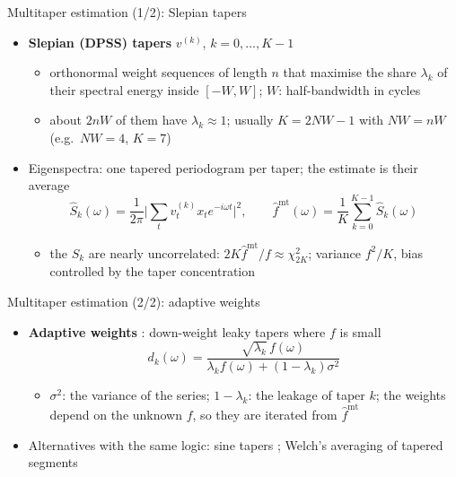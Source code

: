 \begin{frame}{Multitaper estimation (1/2): Slepian tapers}
\itemsize{\small}
\begin{itemize}
    \item \textbf{Slepian (DPSS) tapers} $v^{(k)}$, $k = 0, \dots, K - 1$ 
    \begin{itemize}
        \item orthonormal weight sequences of length $n$ that maximise the share $\lambda_k$ of their spectral energy inside $[-W, W]$; $W$: half-bandwidth in cycles
        \item about $2nW$ of them have $\lambda_k \approx 1$; usually $K = 2NW - 1$ with $NW = nW$ (e.g.\ $NW = 4$, $K = 7$)
    \end{itemize}
    \item Eigenspectra: one tapered periodogram per taper; the estimate is their average
    \[ \hat S_k(\omega) = \frac{1}{2\pi}\Big|\sum_tv_t^{(k)}x_te^{-i\omega t}\Big|^2, \qquad \hat f^{\mathrm{mt}}(\omega) = \frac1K\sum_{k=0}^{K-1}\hat S_k(\omega) \]
    \begin{itemize}
        \item the $\hat S_k$ are nearly uncorrelated: $2K\hat f^{\mathrm{mt}}/f \approx \chi^2_{2K}$; variance $f^2/K$, bias controlled by the taper concentration
    \end{itemize}
\end{itemize}
\end{frame}

\begin{frame}{Multitaper estimation (2/2): adaptive weights}
\itemsize{\small}
\begin{itemize}
    \item \textbf{Adaptive weights} : down-weight leaky tapers where $f$ is small
    \[ d_k(\omega) = \frac{\sqrt{\lambda_k}\,f(\omega)}{\lambda_kf(\omega) + (1 - \lambda_k)\sigma^2} \]
    \begin{itemize}
        \item $\sigma^2$: the variance of the series; $1 - \lambda_k$: the leakage of taper $k$; the weights depend on the unknown $f$, so they are iterated from $\hat f^{\mathrm{mt}}$
    \end{itemize}
    \item Alternatives with the same logic: sine tapers ; Welch's averaging of tapered segments 
\end{itemize}
\end{frame}

